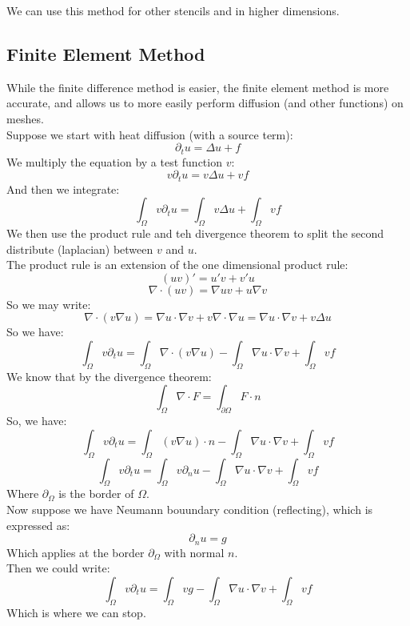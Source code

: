 \documentclass[12pt]{article}
\begin{document}
We can use this method for other stencils and in higher
dimensions. \\

\newpage

\subsection*{Finite Element Method}

While the finite difference method is easier, the finite
element method is more accurate, and allows us to more
easily perform diffusion (and other functions) on meshes. \\

Suppose we start with heat diffusion (with a source term):
\[ \partial_t u = \Delta u + f \]
We multiply the equation by a test function $v$:
\[ v \partial_t u = v\Delta u + vf \]
And then we integrate:
\[ \int_\Omega v \partial_t u = 
\int_\Omega v\Delta u +  \int_\Omega vf \]
We then use the product rule and teh divergence
theorem to split the second distribute (laplacian)
between $v$ and $u$. \\
The product rule is an extension of the one dimensional
product rule:
\[ (uv)' = u'v + v'u \]
\[ \nabla \cdot (uv) = \nabla u v + u\nabla v \]
So we may write:
\[ \nabla \cdot (v \nabla u) = \nabla u \cdot \nabla v + 
v \nabla \cdot \nabla u = 
\nabla u \cdot \nabla v + v \Delta u \]
So we have:
\[ \int_\Omega v \partial_t u = 
\int_\Omega \nabla \cdot (v \nabla u)
- \int_\Omega \nabla u \cdot \nabla v + \int_\Omega vf \]
We know that by the divergence theorem:
\[ \int_\Omega \nabla \cdot F = 
\int_{\partial \Omega} F \cdot n \]
So, we have:
\[ \int_\Omega v \partial_t u = 
\int_\Omega (v \nabla u) \cdot n
- \int_\Omega \nabla u \cdot \nabla v + \int_\Omega vf \]
\[ \int_\Omega v \partial_t u = 
\int_\Omega v \partial_n u
- \int_\Omega \nabla u \cdot \nabla v + \int_\Omega vf \]
Where $\partial_\Omega$ is the border of $\Omega$. \\

Now suppose we have Neumann bouundary condition (reflecting),
which is expressed as:
\[ \partial_n u = g \]
Which applies at the border $\partial_\Omega$
with normal $n$. \\
Then we could write:
\[ \int_\Omega v \partial_t u = 
\int_\Omega vg
- \int_\Omega \nabla u \cdot \nabla v + \int_\Omega vf \]
Which is where we can stop. \\
\end{document}
